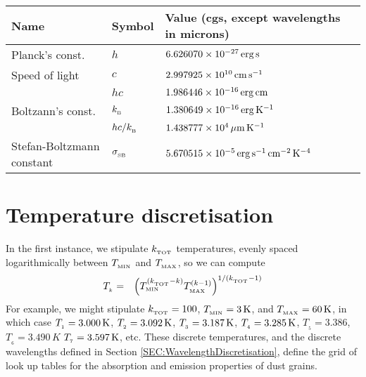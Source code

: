 \documentclass[usenatbib]{mn2e}
\numberwithin{equation}{section}
\begin{document}
\begin{table*}
\begin{center}
\begin{tabular}{lll}\hline
{\sc Name} & {\sc Symbol} & {\sc Value} (cgs, except wavelengths in microns) \\\hline
Planck's const. & $h$ & $6.626070\times 10^{-27}\,{\rm erg}\,{\rm s}$ \\
Speed of light & $c$ & $2.997925\times 10^{10}\,{\rm cm}\,{\rm s}^{-1}$ \\
 & $hc$ & $1.986446\times 10^{-16}\,{\rm erg}\,{\rm cm}$ \\
 Boltzann's const. & $k_{_{\rm B}}$ & $1.380649\times 10^{-16}\,{\rm erg}\,{\rm K}^{-1}$ \\
  & $hc/k_{_{\rm B}}$ & $1.438777\times 10^4\,\mu{\rm m}\,{\rm K}^{-1}$ \\
 Stefan-Boltzmann constant & $\sigma_{_{\rm SB}}$ & $5.670515\times 10^{-5}\,{\rm erg}\,{\rm s}^{-1}\,{\rm cm}^{-2}\,{\rm K}^{-4}$ \\
\hline
\end{tabular}
\end{center}
\end{table*}





\section{Temperature discretisation}\label{SEC:TemperatureDiscretisation}

In the first instance, we stipulate $k_{_{\rm TOT}}$ temperatures, evenly spaced logarithmically between $T_{_{\rm MIN}}$ and $T_{_{\rm MAX}}$, so we can compute
\begin{eqnarray}
T_{_k}&=&\left(T_{_{\rm MIN}}^{(k_{_{\rm TOT}}-k)}T_{_{\rm MAX}}^{(k-1)}\right)^{1/(k_{_{\rm TOT}}-1)}
\end{eqnarray}
For example, we might stipulate $k_{_{\rm TOT}}=100$, $T_{_{\rm MIN}}=3\,{\rm K}$, and $T_{_{\rm MAX}}=60\,{\rm K}$, in which case $T_{_1}=3.000\,{\rm K}$, $T_{_2}=3.092\,{\rm K}$, $T_{_3}=3.187\,{\rm K}$, $T_{_4}=3.285\,{\rm K}$, $T_{_5}=3.386$, $T_{_6}=3.490\,K$ $T_{_7}=3.597\,{\rm K}$, etc. These discrete temperatures, and the discrete wavelengths defined in Section \ref{SEC:WavelengthDiscretisation}, define the grid of look up tables for the absorption and emission properties of dust grains.

\vspace{0.5cm}
\end{document}
